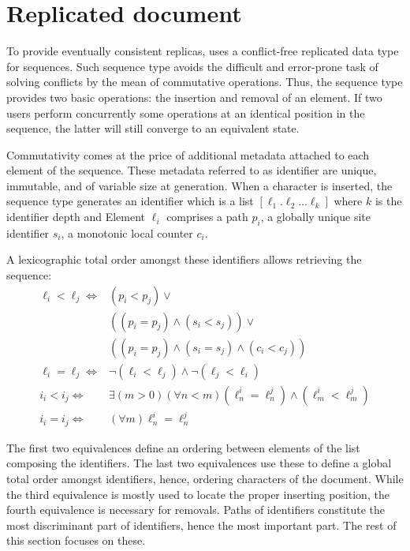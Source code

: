 
\section{Replicated document}
\label{sec:structure}

To provide eventually consistent replicas, \CRATE uses a conflict-free
replicated data type for sequences. Such sequence type avoids the difficult and
error-prone task of solving conflicts by the mean of commutative
operations. Thus, the sequence type provides two basic operations: the insertion
and removal of an element. If two users perform concurrently some operations at
an identical position in the sequence, the latter will still converge to an
equivalent state.

Commutativity comes at the price of additional metadata attached to each
element of the sequence. These metadata referred to as identifier are unique,
immutable, and of variable size at generation. When a character is inserted, the
sequence type generates an identifier which is a list
$[\ell_1.\ell_2\ldots \ell_k]$ where $k$ is the identifier depth and Element
$\ell_i$ comprises a path $p_i$, a globally unique site identifier $s_i$, a
monotonic local counter $c_i$.

A lexicographic total order amongst these identifiers allows retrieving the
sequence:
\begin{align*}
  \ell_i < \ell_j \iff & (p_i < p_j) \vee \\
                       & ((p_i = p_j) \wedge (s_i<s_j)) \vee \\
                       & ((p_i = p_j) \wedge (s_i = s_j) \wedge (c_i < c_j)) \\
  \ell_i = \ell_j \iff & \neg (\ell_i < \ell_j) \wedge \neg (\ell_j < \ell_i) \\
  i_i < i_j \iff & \exists (m > 0)(\forall n < m) (\ell^i_n = \ell^j_n) \wedge (\ell^i_m < \ell^j_m) \\
  i_i = i_j \iff & (\forall m) \ell^i_n = \ell^j_n
\end{align*}

The first two equivalences define an ordering between elements of the list
composing the identifiers. The last two equivalences use these to define a
global total order amongst identifiers, hence, ordering characters of the
document. While the third equivalence is mostly used to locate the proper
inserting position, the fourth equivalence is necessary for removals.  Paths of
identifiers constitute the most discriminant part of identifiers, hence the most
important part. The rest of this section focuses on these.

